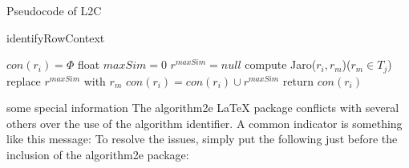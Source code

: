 \documentclass{article}
\begin{document}
        \begin{algorithm}[H]
            \caption{Pseudocode of L2C}
            
    	\end{algorithm}

%            
    
    \begin{algorithm} 
     \caption{identifyRowContext} 
        $con(r_i)= \Phi$\; 
        { 
            float $maxSim=0$\; 
            $r^{maxSim}=null$\; 
            { 
                compute Jaro($r_i,r_m$)($r_m\in T_j$)\; 
                { 
                    replace $r^{maxSim}$ with $r_m$\; 
                } 
            } 
            $con(r_i)=con(r_i)\cup {r^{maxSim}}$\; 
        } 
        return $con(r_i)$\; 
    \end{algorithm}

 some special information
    The algorithm2e LaTeX package conflicts with several others over the use of the algorithm identifier.  A common indicator is something like this message: 
To resolve the issues, simply put the following just before the inclusion of the algorithm2e package:

\end{document}
